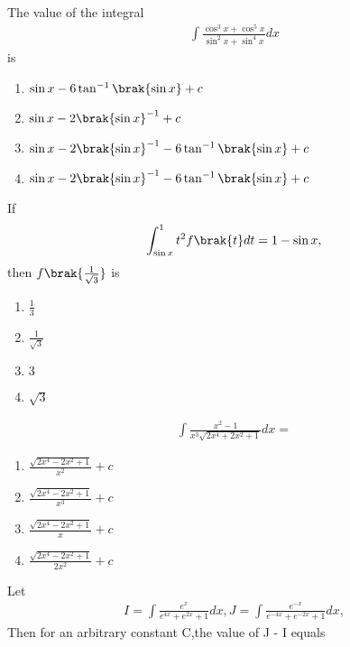
\iffalse
  \title{Assignment}
  \author{Abhijeet Kumar - ai24btech11001}
  \section{mcq-single}
\fi
    \item The value of the integral  
\begin{align*}
    \int\frac{\cos^{3}x + \cos^{5}x}{\sin^{2}x + \sin^{4}x}dx
\end{align*} 
is
\hfill {}
\begin{enumerate}
    \item $\sin x - 6\tan^{-1}\brak{\sin x}+ c$
    \item $\sin x - 2 \brak{\sin x}^{-1} + c$
    \item $\sin x - 2 \brak{\sin x}^{-1} - 6 \tan^{-1}\brak{\sin x} + c$ 
    \item $\sin x - 2 \brak{\sin x}^{-1} - 6 \tan^{-1}\brak{\sin x} + c$
\end{enumerate}
\item If 
\begin{align*}
    \int_{\sin x}^{1}t^2 
 f\brak{t}dt = 1- \sin x,  
\end{align*} 
then $f\brak{\frac{1}{\sqrt{3}}}$ is 
\hfill {}
\begin{multicols}{2}
\begin{enumerate}
    \item $\frac{1}{3}$
    \item $\frac{1}{\sqrt{3}}$
    \item $3$ 
    \item $\sqrt{3}$
\end{enumerate}
\end{multicols}
\item 
\begin{align*}
    \int\frac{x^{2} - 1}{x^{3}\sqrt{2x^{4}+2x^{2}+1}}dx = 
\end{align*}
\hfill {}
\begin{enumerate}
    \item $\frac{\sqrt{2x^{4}-2x^{2}+1}}{x^{2}} + c$
    \item $\frac{\sqrt{2x^{4}-2x^{2}+1}}{x^{3}} +c$
    \item $\frac{\sqrt{2x^{4}-2x^{2}+1}}{x} +c$ 
    \item $\frac{\sqrt{2x^{4}-2x^{2}+1}}{2x^{2}} +c$
\end{enumerate}
\item Let 
\begin{align*}
    I=\int\frac{e^{x}}{e^{4x}+e^{2x} +1}dx , 
 J=\int\frac{e^{-x}}{e^{-4x}+e^{-2x} +1}dx, 
\end{align*} Then for an arbitrary constant C,the value of J - I equals 

